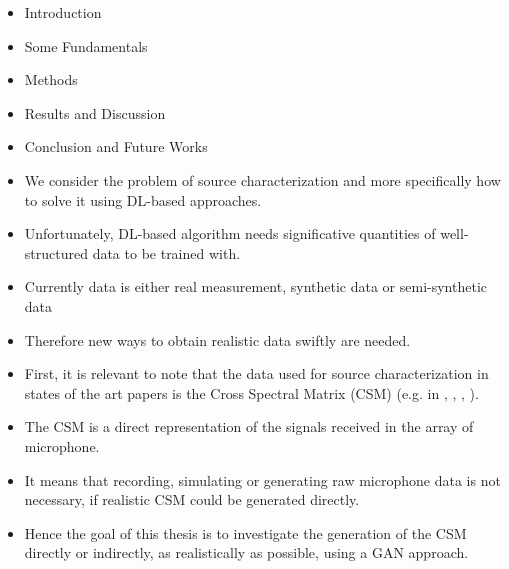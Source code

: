\documentclass[12pt,pdftex,16x10]{elpres} %
\begin{document}
\begin{psli}[Agenda]
  \begin{itemize}
    \item Introduction
    \item Some Fundamentals
    \item Methods
    \item Results and Discussion
    \item Conclusion and Future Works
  \end{itemize}
\end{psli}

\begin{psli}
  \begin{itemize}
    \item We consider the problem of source characterization and more specifically how to solve it using DL-based approaches.
    \item Unfortunately, DL-based algorithm needs significative quantities of well-structured data to be trained with.
    \item Currently data is either real measurement, synthetic data or semi-synthetic data %
    \item Therefore new ways to obtain realistic data swiftly are needed. 
  \end{itemize}
\end{psli}

\begin{psli}
  \begin{itemize}
    \item First, it is relevant to note that the data used for source characterization in states of the art papers is the Cross Spectral Matrix (CSM) (e.g. in \cite{castellini2021neural}, \cite{lee2021deep}, \cite{ma2019phased}, \cite{xu2021deep}).
    \item The CSM is a direct representation of the signals received in the array of microphone.
    \item It means that recording, simulating or generating raw microphone data is not necessary, if realistic CSM could be generated directly. 
    \item Hence the goal of this thesis is to investigate the generation of the CSM directly or indirectly, as realistically as possible, using a GAN approach.
  \end{itemize}
\end{psli}
\end{document}
